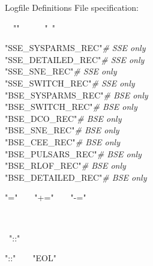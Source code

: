 \bigskip
Logfile Definitions File specification:

\hfill
\begin{minipage}{\dimexpr\textwidth-2em}
    \setlength{\parskip}{6pt}
    \rab\tabto{7em}{::=}\tabto{9em}\lcb{}\rab\rcb

    \rab\tabto{7em}{::=}\tabto{9em}\rab\ \rab\ "\lcb"\ \lcb\ \lsb\ \rab\ \rsb\ \rcb\ "\ \rcb"\ \rab

    \rab\tabto{7em}{::=}\tabto{9em}"SSE\_SYSPARMS\_REC"\tabto{23em}\textbar\tabto{28em}\textit{\# SSE only} \\
    \tabto{9em}"SSE\_DETAILED\_REC"\tabto{23em}\textbar\tabto{28em}\textit{\# SSE only} \\
    \tabto{9em}"SSE\_SNE\_REC"\tabto{23em}\textbar\tabto{28em}\textit{\# SSE only} \\
    \tabto{9em}"SSE\_SWITCH\_REC"\tabto{23em}\textbar\tabto{28em}\textit{\# SSE only} \\
    \tabto{9em}"BSE\_SYSPARMS\_REC"\tabto{23em}\textbar\tabto{28em}\textit{\# BSE only} \\
    \tabto{9em}"BSE\_SWITCH\_REC"\tabto{23em}\textbar\tabto{28em}\textit{\# BSE only} \\       \tabto{9em}"BSE\_DCO\_REC"\tabto{23em}\textbar\tabto{28em}\textit{\# BSE only} \\
    \tabto{9em}"BSE\_SNE\_REC"\tabto{23em}\textbar\tabto{28em}\textit{\# BSE only} \\
    \tabto{9em}"BSE\_CEE\_REC"\tabto{23em}\textbar\tabto{28em}\textit{\# BSE only} \\
    \tabto{9em}"BSE\_PULSARS\_REC"\tabto{23em}\textbar\tabto{28em}\textit{\# BSE only} \\
    \tabto{9em}"BSE\_RLOF\_REC"\tabto{23em}\textbar\tabto{28em}\textit{\# BSE only} \\
    \tabto{9em}"BSE\_DETAILED\_REC"\tabto{23em}\textbar\tabto{28em}\textit{\# BSE only}

    \rab\tabto{7em}{::=}\tabto{9em}"="\ \ \textbar\ \ "+="\ \ \textbar\ \ "-="

    \rab\tabto{7em}{::=}\tabto{9em}\rab\ \lsb\ \rab\  \rab\ \rsb

    \rab\tabto{7em}{::=}\tabto{9em}\rab\ "::"\ \rab\  \rab

    \rab\tabto{7em}{::=}\tabto{9em}"::"\ \ \textbar\ \ "EOL"


\end{minipage}
